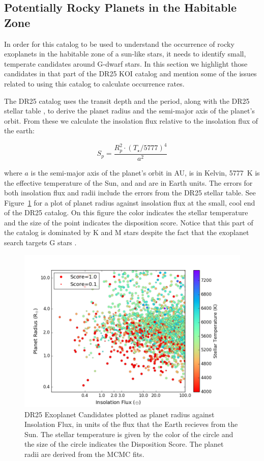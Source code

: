 \label{s:hz}
\subsection{Potentially Rocky Planets in the Habitable Zone}
In order for this catalog to be used to understand the occurrence of rocky exoplanets in the habitable zone of a sun-like stars, it needs to identify small, temperate candidates around G-dwarf stars.  In this section we highlight those candidates in that part of the DR25 KOI catalog and mention some of the issues related to using this catalog to calculate occurrence rates.

The DR25 catalog uses the transit depth and the period, along with the DR25 stellar table \citet{Mathur2017ApJS}, to derive the planet radius and the semi-major axis of the planet's orbit.  From these we calculate the insolation flux relative to the insolation flux of the earth:

\begin{equation}
S_{p} = \frac{R_{p}^{2} \cdot (T_{\star}/5777)^{4}}{a^{2}}
\end{equation}

\noindent where $a$ is the semi-major axis of the planet's orbit in AU, \tstar{} is in Kelvin, 5777~K is the effective temperature of the Sun, and \sp{} and \rp{} are in Earth units. The errors for both insolation flux and radii include the errors from the DR25 stellar table. See Figure~\ref{f:hzPlot} for a plot of planet radius against insolation flux at the small, cool end of the DR25 catalog. On this figure the color indicates the stellar temperature and the size of the point indicates the disposition score.  Notice that this part of the catalog is dominated by K and M stars despite the fact that the exoplanet search targets G stars \citet{Batalha2010}.

\begin{figure}
    \centering
    \includegraphics[width=1.1\linewidth]{fig-CatalogRadiusInsolScore.png}
    \caption{DR25 Exoplanet Candidates plotted as planet radius against Insolation Flux, in units of the flux that the Earth recieves from the Sun. The stellar temperature is given by the color of the circle and the size of the circle indicates the Disposition Score. The planet radii are derived from the MCMC fits. }
    \label{f:hzPlot}
\end{figure}

